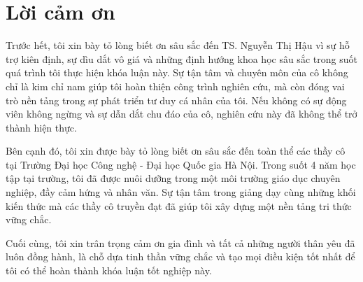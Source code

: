 \chapter*{Lời cảm ơn}

Trước hết, tôi xin bày tỏ lòng biết ơn sâu sắc đến TS. Nguyễn Thị Hậu vì sự hỗ trợ kiên định, sự dìu dắt vô giá và những định hướng khoa học sâu sắc trong suốt quá trình tôi thực hiện khóa luận này. Sự tận tâm và chuyên môn của cô không chỉ là kim chỉ nam giúp tôi hoàn thiện công trình nghiên cứu, mà còn đóng vai trò nền tảng trong sự phát triển tư duy cá nhân của tôi. Nếu không có sự động viên không ngừng và sự dẫn dắt chu đáo của cô, nghiên cứu này đã không thể trở thành hiện thực.

Bên cạnh đó, tôi xin được bày tỏ lòng biết ơn sâu sắc đến toàn thể các thầy cô tại Trường Đại học Công nghệ - Đại học Quốc gia Hà Nội. Trong suốt 4 năm học tập tại trường, tôi đã được nuôi dưỡng trong một môi trường giáo dục chuyên nghiệp, đầy cảm hứng và nhân văn. Sự tận tâm trong giảng dạy cùng những khối kiến thức mà các thầy cô truyền đạt đã giúp tôi xây dựng một nền tảng tri thức vững chắc.

Cuối cùng, tôi xin trân trọng cảm ơn gia đình và tất cả những người thân yêu đã luôn đồng hành, là chỗ dựa tinh thần vững chắc và tạo mọi điều kiện tốt nhất để tôi có thể hoàn thành khóa luận tốt nghiệp này.